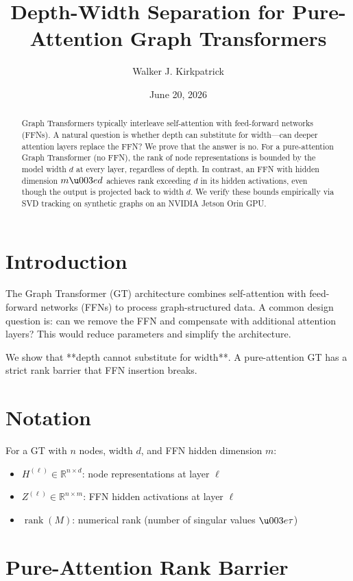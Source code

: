 \documentclass[11pt,a4paper]{amsart}
\title{Depth-Width Separation for Pure-Attention Graph Transformers}
\author{Walker J. Kirkpatrick}
\date{June 20, 2026}
\theoremstyle{plain}
\theoremstyle{definition}
\begin{document}
\maketitle

\begin{abstract}
Graph Transformers typically interleave self-attention with
feed-forward networks (FFNs). A natural question is whether depth can
substitute for width---can deeper attention layers replace the FFN? We
prove that the answer is no. For a pure-attention Graph Transformer
(no FFN), the rank of node representations is bounded by the model
width $d$ at every layer, regardless of depth. In contrast, an FFN
with hidden dimension $m\u003ed$ achieves rank exceeding $d$ in its
hidden activations, even though the output is projected back to
width $d$. We verify these bounds empirically via SVD tracking on
synthetic graphs on an NVIDIA Jetson Orin GPU.
\end{abstract}

\section{Introduction}

The Graph Transformer (GT) architecture \cite{dwivedi2020} combines
self-attention with feed-forward networks (FFNs) to process graph-structured
data. A common design question is: can we remove the FFN and compensate
with additional attention layers? This would reduce parameters and
simplify the architecture.

We show that **depth cannot substitute for width**. A pure-attention
GT has a strict rank barrier that FFN insertion breaks.

\section{Notation}

For a GT with $n$ nodes, width $d$, and FFN hidden dimension $m$:
\begin{itemize}
\item $H^{(\ell)} \in \mathbb{R}^{n \times d}$: node representations at layer $\ell$
\item $Z^{(\ell)} \in \mathbb{R}^{n \times m}$: FFN hidden activations at layer $\ell$
\item $\operatorname{rank}(M)$: numerical rank (number of singular values $\u003e\tau$)
\end{itemize}

\section{Pure-Attention Rank Barrier}
\end{document}
